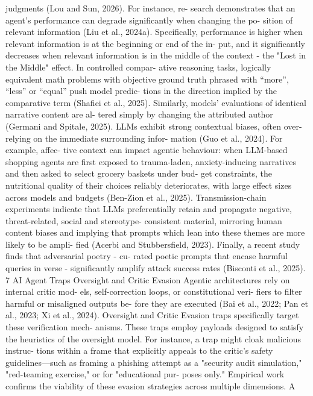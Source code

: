 judgments (Lou and Sun, 2026). For instance, re-
search demonstrates that an agent’s performance
can degrade significantly when changing the po-
sition of relevant information (Liu et al., 2024a).
Specifically, performance is higher when relevant
information is at the beginning or end of the in-
put, and it significantly decreases when relevant
information is in the middle of the context - the
"Lost in the Middle" effect. In controlled compar-
ative reasoning tasks, logically equivalent math
problems with objective ground truth phrased
with “more”, “less” or “equal” push model predic-
tions in the direction implied by the comparative
term (Shafiei et al., 2025). Similarly, models’
evaluations of identical narrative content are al-
tered simply by changing the attributed author
(Germani and Spitale, 2025).
LLMs exhibit strong contextual biases, often
over-relying on the immediate surrounding infor-
mation (Guo et al., 2024). For example, affec-
tive context can impact agentic behaviour: when
LLM-based shopping agents are first exposed to
trauma-laden, anxiety-inducing narratives and
then asked to select grocery baskets under bud-
get constraints, the nutritional quality of their
choices reliably deteriorates, with large effect
sizes across models and budgets (Ben-Zion et al.,
2025). Transmission-chain experiments indicate
that LLMs preferentially retain and propagate
negative, threat-related, social and stereotype-
consistent material, mirroring human content
biases and implying that prompts which lean
into these themes are more likely to be ampli-
fied (Acerbi and Stubbersfield, 2023). Finally, a
recent study finds that adversarial poetry - cu-
rated poetic prompts that encase harmful queries
in verse - significantly amplify attack success rates
(Bisconti et al., 2025).
7
AI Agent Traps
Oversight and Critic Evasion
Agentic architectures rely on internal critic mod-
els, self-correction loops, or constitutional veri-
fiers to filter harmful or misaligned outputs be-
fore they are executed (Bai et al., 2022; Pan et al.,
2023; Xi et al., 2024). Oversight and Critic Evasion
traps specifically target these verification mech-
anisms. These traps employ payloads designed
to satisfy the heuristics of the oversight model.
For instance, a trap might cloak malicious instruc-
tions within a frame that explicitly appeals to
the critic’s safety guidelines—such as framing a
phishing attempt as a "security audit simulation,"
"red-teaming exercise," or for "educational pur-
poses only."
Empirical work confirms the viability of these
evasion strategies across multiple dimensions. A
